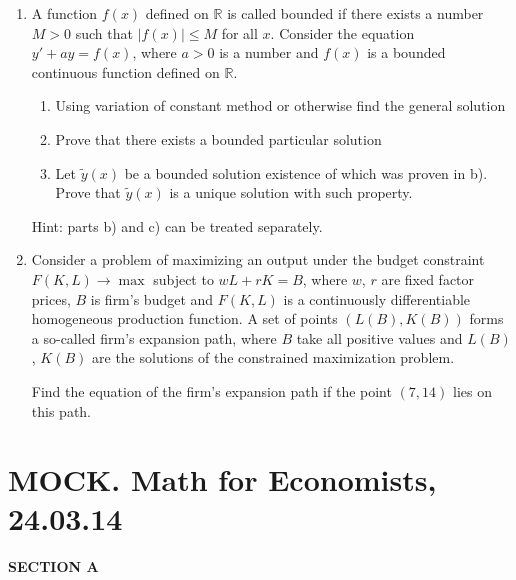 \documentclass[12pt]{article}
\begin{document}
\begin{enumerate}[resume]
\item A function $f(x)$ defined on $\mathbb{R}$ is called bounded if there exists a number $M>0$ such that $|f(x)| \leq M$ for all $x$. Consider the equation $y'+ ay = f (x)$, where $a>0$ is a number and $f (x)$  is a bounded continuous function defined on $\mathbb{R}$.
\begin{enumerate}
\item Using variation of constant method or otherwise find the general solution 
\item  Prove that there exists a bounded particular solution 
\item Let $\tilde{y}(x)$  be a bounded solution existence of which was proven in b). Prove that $\tilde{y}(x)$ is a unique solution with such property. 
\end{enumerate}
Hint: parts b) and c) can be treated separately.


\item Consider a problem of maximizing an output under the budget constraint $F(K,L) \to \max$ subject to $wL+rK=B$, where $w$, $r$ are fixed factor prices, $B$ is firm's budget and $F(K,L)$ is a continuously differentiable homogeneous production function. A set of points $(L(B),K(B))$ forms a so-called firm's expansion path, where $B$ take all positive values and $L(B)$, $K(B)$ are the solutions of the constrained maximization problem.

Find the equation of the firm's expansion path if the point $(7,14)$ lies on this path.
\end{enumerate}

\newpage

\section*{MOCK. Math for Economists, 24.03.14}

\textbf{SECTION A}
\end{document}
